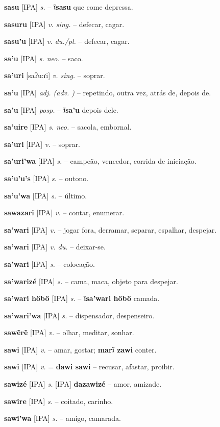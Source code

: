 \textbf{sasu} [IPA] \textit{s.} -- \textbf{ĩsasu} que come depressa.

\textbf{sasuru} [IPA] \textit{v. sing.} -- defecar, cagar.

\textbf{sasu'u} [IPA] \textit{v. du./pl.} -- defecar, cagar.

\textbf{sa'u} [IPA] \textit{s. neo.} -- saco.

\textbf{sa'uri} [saʔu:ɾi] \textit{v. sing.} -- soprar.

\textbf{sa'u} [IPA] \textit{adj. (adv. )} -- repetindo, outra vez, atrás de, depois de.

\textbf{sa'u} [IPA] \textit{posp.} -- \textbf{ĩsa'u} depois dele.

\textbf{sa'uire} [IPA] \textit{s. neo.} -- sacola, embornal.

\textbf{sa'uri} [IPA] \textit{v.} -- soprar.

\textbf{sa'uri'wa} [IPA] \textit{s.} -- campeão, vencedor, corrida de iniciação.

\textbf{sa'u'u's} [IPA] \textit{s.} -- outono.

\textbf{sa'u'wa} [IPA] \textit{s.} -- último.

\textbf{sawazari} [IPA] \textit{v.} -- contar, enumerar.

\textbf{sa'wari} [IPA] \textit{v.} -- jogar fora, derramar, separar, espalhar, despejar.

\textbf{sa'wari} [IPA] \textit{v. du.} -- deixar-se.

\textbf{sa'wari} [IPA] \textit{s.} -- colocação.

\textbf{sa'warizé} [IPA] \textit{s.} -- cama, maca, objeto para despejar.

\textbf{sa'wari höbö} [IPA] \textit{s.} -- \textbf{ĩsa'wari höbö} camada.

\textbf{sa'wari'wa} [IPA] \textit{s.} -- dispensador, despenseiro.

\textbf{sawẽrẽ} [IPA] \textit{v.} -- olhar, meditar, sonhar.

\textbf{sawi} [IPA] \textit{v.} -- amar, gostar; \textbf{marĩ zawi} conter.

\textbf{sawi} [IPA] \textit{v.} = \textbf{dawi sawi} -- recusar, afastar, proibir.

\textbf{sawizé} [IPA] \textit{s.} [IPA] \textbf{dazawizé} -- amor, amizade.

\textbf{sawire} [IPA] \textit{s.} -- coitado, carinho.

\textbf{sawi'wa} [IPA] \textit{s.} -- amigo, camarada.

